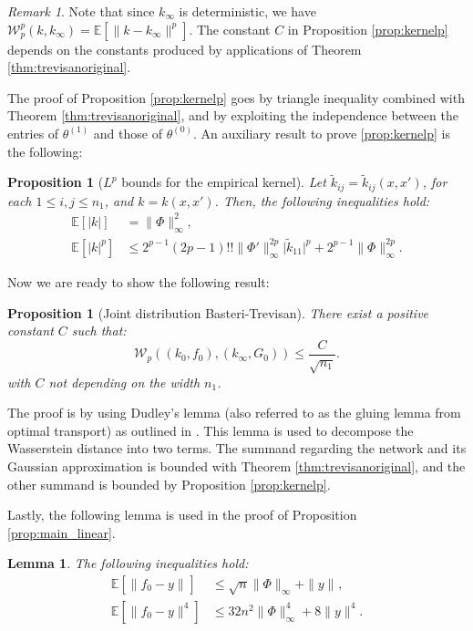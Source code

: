 \documentclass{article}
\newtheorem{lem}[thm]{Lemma}
\newtheorem{prop}[thm]{Proposition}
\theoremstyle{definition}
\theoremstyle{remark}
\newtheorem{rem}[thm]{Remark}
\numberwithin{equation}{section}
\newcommand{\E}{\mathbb{E}}
\newcommand{\norm}[2]{
    \|#1\|_{#2}
}
\begin{document}
\begin{rem}
    Note that since $k_\infty$ is deterministic, we have $\mathcal W_p^p(k,k_\infty) = \E[\norm{k -  k_\infty}{}^p]$.
    The constant $C$ in Proposition \ref{prop:kernelp} depends on the constants produced by applications of Theorem \ref{thm:trevisanoriginal}.
\end{rem}

The proof of Proposition \ref{prop:kernelp} goes by triangle inequality combined with Theorem \ref{thm:trevisanoriginal}, 
and by exploiting the independence between the entries of $\theta^{(1)}$ and those of $\theta^{(0)}$.
An auxiliary result to prove \ref{prop:kernelp} is the following:

\begin{prop}[$L^p$ bounds for the empirical kernel]
    \label{prop:kernelbound}
    Let $\tilde k_{ij} = \tilde k_{ij}(x,x')$, for each $1 \le i,j \le n_1$, and $k=k(x,x')$.
    Then, the following inequalities hold:
    \begin{align}
        \E[\vert k\vert] &= \norm{\Phi}{\infty}^2,\\
        \E[\vert k\vert^p] &\le 2^{p-1}(2p-1)!!\norm{\Phi'}{\infty}^{2p}\vert \tilde k_{11}\vert^p + 2^{p-1}\norm{\Phi}{\infty}^{2p}.
    \end{align}
    \end{prop}

Now we are ready to show the following result:

\begin{prop}[Joint distribution Basteri-Trevisan]
\label{prop:trevisan}
There exist a positive constant $C$ such that:
\[
\mathcal W_p \left(\left(k_0, f_0\right), \left(k_\infty, G_0\right)\right)  \le  \frac{C}{\sqrt{n_1}}.
\]
with $C$ not depending on the width $n_1$.
\end{prop}

The proof is by using Dudley's lemma (also referred to as the gluing lemma from optimal transport) as outlined in \cite{villani_transport}.
This lemma is used to decompose the Wasserstein distance into two terms. 
The summand regarding the network and its Gaussian approximation is bounded with Theorem \ref{thm:trevisanoriginal}, 
and the other summand is bounded by Proposition \ref{prop:kernelp}.

Lastly, the following lemma is used in the proof of Proposition \ref{prop:main_linear}.

\begin{lem}
The following inequalities hold:
    \label{lem:4moment}
    \begin{align}
        \E[\norm{f_0-y}{}]&\le \sqrt{n}\norm{\Phi}{\infty} + \norm{y}{},\\
        \E[\norm{f_0-y}{}^4]&\le 32n^2\norm{\Phi}{\infty}^4 + 8\norm{y}{}^4.
    \end{align}
\end{lem}
\end{document}
